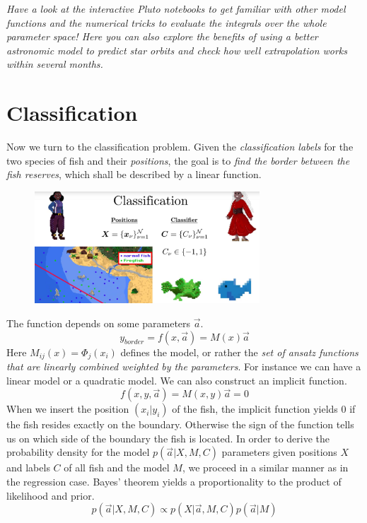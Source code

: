 \documentclass[12pt, a4paper]{scrartcl}
\begin{document}
\textit{Have a look at the interactive Pluto notebooks to get familiar with other
model functions and the numerical tricks to evaluate the integrals over the
whole parameter space! Here you can also explore the benefits of using a better 
astronomic model to predict star orbits and check how well extrapolation
works within several months.}\\

\section*{Classification}
Now we turn to the classification problem.
Given the \textit{classification labels} for the two species of fish and their \textit{positions}, the goal
is to \textit{find the border between the fish reserves}, which shall be described by
a linear function.\\%
\begin{figure}[H]
	\centering
	\includegraphics[width=0.75\textwidth]{7_12.png}
\end{figure}

The function depends on some parameters $\vec{a}$. 
\[y_{border}=f(x,\vec{a})=M(x)\vec{a}\]
Here $M_{ij}(x)=\Phi_j(x_i)$ defines the model, or rather
the \textit{set of ansatz functions that are linearly combined weighted by the parameters}. For instance we can have a linear model or a quadratic model. We can also construct an implicit function. \[f(x,y,\vec{a})=M(x,y)\vec{a}=0\]
When we insert the position $(x_i|y_i)$ of the fish, the implicit function yields 0 if the fish resides exactly on the boundary. Otherwise the sign of the function tells us on which side of the boundary the fish is located. 
In order to derive the probability density for the model $p(\vec{a}|X,M,C)$
parameters given positions $X$ and labels $C$ of all fish and the model $M$, we proceed in a similar manner as in the regression case. Bayes’ theorem yields a proportionality to the product of likelihood and prior.\[p(\vec{a}|X,M,C)\propto p(X|\vec{a},M,C)p(\vec{a}|M)\]
\end{document}

